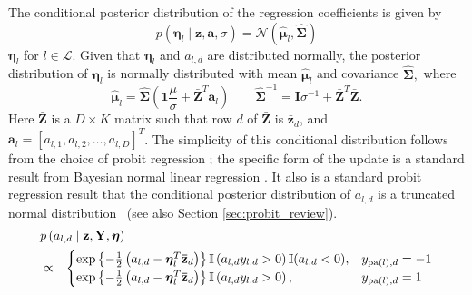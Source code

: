The conditional posterior distribution of the regression coefficients is given by 
\begin{equation}
p(\boldsymbol\eta_{l}\mid\mathbf{z},\mathbf{a},\sigma) = \mathcal{N}(\hat{\boldsymbol\mu}_{l},\hat{\mathbf{\Sigma}})\label{eqn:regression_param_conditional}
\end{equation}
$\boldsymbol\eta_{l}$ for $l\in\mathcal{L}$. Given that $\boldsymbol\eta_{l}$
and $a_{l,d}$ are distributed normally, the posterior distribution
of $\boldsymbol\eta_{l}$ is normally distributed with mean $\hat{\boldsymbol\mu}_{l}$
and covariance $\hat{\mathbf{\Sigma}},$%
where
\begin{equation*}
\hat{\boldsymbol\mu}_{l}  =  \hat{\mathbf{\Sigma}}\left(\mathbf{1}\frac{\mu}{\sigma}+\bar{\mathbf{Z}}^{T}\mathbf{a}_{l}\right) \qquad \hat{\mathbf{\Sigma}}^{-1}  =  \mathbf{I}\sigma^{-1}+\bar{\mathbf{Z}}^{T}\bar{\mathbf{Z}}
.\end{equation*}
Here $\bar{\mathbf{Z}}$ is a $D\times K$ matrix
such that row $d$ of $\mathbf{\bar{Z}}$ is $\bar{\mathbf{z}}_{d}$, and $\mathbf{a}_{l}=[a_{l,1},a_{l,2},\ldots,a_{l,D}]^{T}$.  The simplicity of this conditional distribution follows from the choice of probit regression  \cite{Albert_Chib_1993}; the specific form of the update is a standard result from Bayesian normal  linear regression \cite{gelmanbda04}. 
It also is a standard probit regression result that the conditional posterior
distribution of $a_{l,d}$ is a truncated normal
distribution~\cite{Albert_Chib_1993} (see also Section \ref{sec:probit_review}). 
\begin{eqnarray*}
\lefteqn{p\left(a_{l,d}\mid\mathbf{z},\mathbf{Y},\mathbf{\boldsymbol\eta}\right)}\\&\propto&
\begin{cases}
\exp\left\{ -\frac{1}{2}\left(a_{l,d}-\boldsymbol\eta_{l}^{T}\mathbf{\bar{z}}_{d}\right)\right\} \mathbb{I}\left(a_{l,d}y_{l,d}>0\right)\mathbb{I}(a_{l,d}<0) , & y_{\mathrm{pa}(l),d}=-1\\
\exp\left\{ -\frac{1}{2}\left(a_{l,d}-\boldsymbol\eta_{l}^{T}\mathbf{\bar{z}}_{d}\right)\right\} \mathbb{I}\left(a_{l,d}y_{l,d}>0\right) , & y_{\mathrm{pa}(l),d}=1\end{cases}\label{eqn:a_l_d}\end{eqnarray*}

